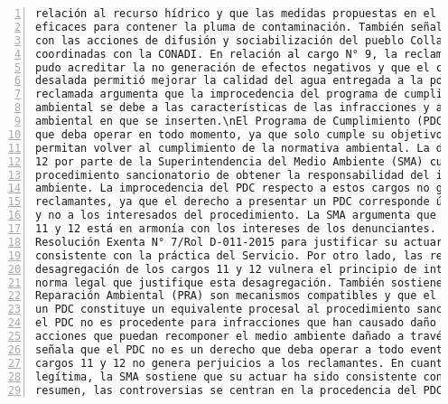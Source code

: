 \begin{Verbatim}[frame=lines, label=Elavoración propia -  Ejemplo de Contexto enviado por el Chatbot a OpenAI
				, fontsize=\footnotesize, numbers=left
				, baselinestretch=0.4
				, formatcom=\color{gray}]
relación al recurso hídrico y que las medidas propuestas en el programa de cumplimiento son
eficaces para contener la pluma de contaminación. También señala que la empresa ha cumplido
con las acciones de difusión y sociabilización del pueblo Colla, pese a no haber sido
coordinadas con la CONADI. En relación al cargo N° 9, la reclamada sostiene que la empresa
pudo acreditar la no generación de efectos negativos y que el caudal entregado de agua
desalada permitió mejorar la calidad del agua entregada a la población. Por último, la
reclamada argumenta que la improcedencia del programa de cumplimiento en casos de daño
ambiental se debe a las características de las infracciones y al contexto regulatorio
ambiental en que se inserten.\nEl Programa de Cumplimiento (PDC) no es un derecho del titular
que deba operar en todo momento, ya que solo cumple su objetivo a través de medidas que
permitan volver al cumplimiento de la normativa ambiental. La desagregación de los cargos 11 y
12 por parte de la Superintendencia del Medio Ambiente (SMA) cumple con la finalidad del
procedimiento sancionatorio de obtener la responsabilidad del infractor y proteger el medio
ambiente. La improcedencia del PDC respecto a estos cargos no genera perjuicios a los
reclamantes, ya que el derecho a presentar un PDC corresponde únicamente al presunto infractor
y no a los interesados del procedimiento. La SMA argumenta que la desagregación de los cargos
11 y 12 está en armonía con los intereses de los denunciantes. Además, la SMA se refiere a la
Resolución Exenta N° 7/Rol D-011-2015 para justificar su actuar y sostiene que ha sido
consistente con la práctica del Servicio. Por otro lado, las reclamantes argumentan que la
desagregación de los cargos 11 y 12 vulnera el principio de integridad y que no existe una
norma legal que justifique esta desagregación. También sostienen que el PDC y los Planes de
Reparación Ambiental (PRA) son mecanismos compatibles y que el cumplimiento satisfactorio de
un PDC constituye un equivalente procesal al procedimiento sancionatorio. La SMA argumenta que
el PDC no es procedente para infracciones que han causado daño ambiental, ya que no existen
acciones que puedan recomponer el medio ambiente dañado a través de este instrumento. Además,
señala que el PDC no es un derecho que deba operar a todo evento y que la desagregación de los
cargos 11 y 12 no genera perjuicios a los reclamantes. En cuanto al principio de confianza
legítima, la SMA sostiene que su actuar ha sido consistente con sus propios precedentes. En
resumen, las controversias se centran en la procedencia del PDC para infracciones que han

\end{Verbatim}
